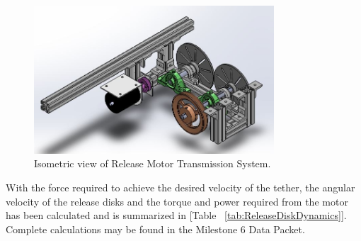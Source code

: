 \begin{figure}[ht]
\centering
\includegraphics[width=0.8\textwidth]{Figures/release_transmission.PNG}
\caption{\label{fig:release_transmission} Isometric view of Release Motor Transmission System.}
\end{figure}


With the force required to achieve the desired velocity of the tether, the angular velocity of the release disks and the torque and power required from the motor has been calculated and is summarized in [Table ~\ref{tab:ReleaseDiskDynamics}]. Complete calculations may be found in the Milestone 6 Data Packet.  

